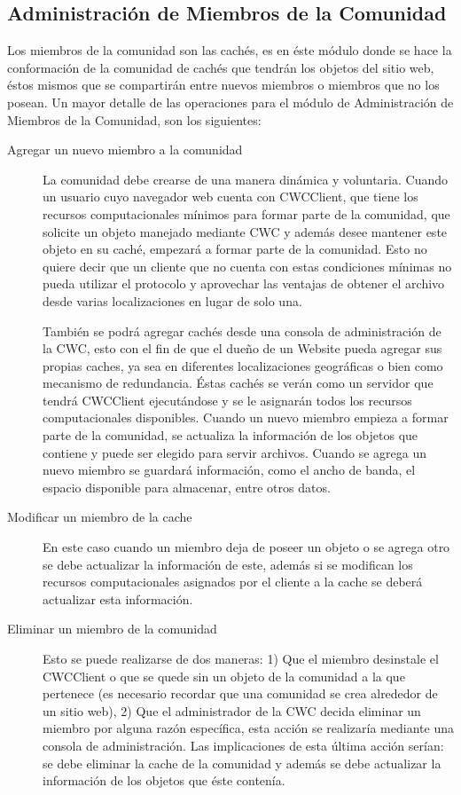 \subsection{Administración de Miembros de la Comunidad }
Los miembros de la comunidad son las cachés, es en éste módulo donde se hace la conformación de la comunidad de cachés que tendrán los objetos del sitio web, éstos mismos que se compartirán entre nuevos miembros o miembros que no los posean. Un mayor detalle de las operaciones para el módulo de Administración de Miembros de la Comunidad, son los siguientes:

\begin{description}
\item[Agregar un nuevo miembro a la comunidad] La comunidad debe crearse de una manera dinámica y voluntaria. Cuando un usuario cuyo navegador web cuenta con CWCClient, que tiene los recursos computacionales mínimos para formar parte de la comunidad, que solicite un objeto manejado mediante CWC y además desee mantener este objeto en su caché, empezará a formar parte de la comunidad. Esto no quiere decir que un cliente que no cuenta con estas condiciones mínimas no pueda utilizar el protocolo y aprovechar las ventajas de obtener el archivo desde varias localizaciones en lugar de solo una. 

También se podrá agregar cachés desde una consola de administración de la CWC, esto con el fin de que el dueño de un Website pueda agregar sus propias caches, ya sea en diferentes localizaciones geográficas o bien como mecanismo de redundancia. Éstas cachés se verán como un servidor que tendrá CWCClient ejecutándose y se le asignarán todos los recursos computacionales disponibles. Cuando un nuevo miembro empieza a formar parte de la comunidad, se actualiza la información de los objetos que contiene y puede ser elegido para servir archivos. Cuando se agrega un nuevo miembro se guardará información, como el ancho de banda, el espacio disponible para almacenar, entre otros datos. 

\item[Modificar un miembro de la cache] En este caso cuando un miembro deja de poseer un objeto o se agrega otro se debe actualizar la información de este, además si se modifican los recursos computacionales asignados por el cliente a la cache se deberá actualizar esta información.

\item[Eliminar un miembro de la comunidad] Esto se puede realizarse de dos maneras: 1) Que el miembro desinstale el CWCClient o que se quede sin un objeto de la comunidad a la que pertenece (es necesario recordar  que una comunidad se crea alrededor de un sitio web), 2) Que el administrador de la CWC decida eliminar un miembro por alguna razón específica, esta acción se realizaría mediante una consola de administración. Las implicaciones de esta última acción serían: se debe eliminar la cache de la comunidad y además se debe actualizar la información de los objetos que éste contenía.


\end{description}
